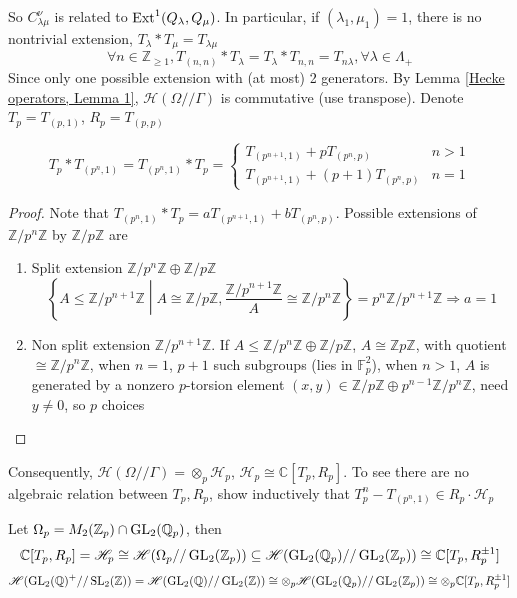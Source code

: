 \documentclass[main]{subfiles}
\begin{document}
So $C^\nu_{\lambda\mu}$ is related to $\operatorname{Ext}^1(Q_\lambda,Q_\mu)$. In particular, if $(\lambda_1,\mu_1)=1$, there is no nontrivial extension, $T_\lambda*T_\mu=T_{\lambda\mu}$
\[\forall n\in\mathbb Z_{\geq1},T_{(n,n)}*T_\lambda=T_\lambda*T_{{n,n}}=T_{n\lambda},\forall\lambda\in\Lambda_+\]
Since only one possible extension with (at most) 2 generators. By Lemma \ref{Hecke operators, Lemma 1}, $\mathscr H(\Omega//\Gamma)$ is commutative (use transpose). Denote $T_p=T_{(p,1)}$, $R_p=T_{(p,p)}$

\begin{lemma}\label{Hecke operators Lemma 4}
\[T_{p}*T_{(p^n,1)}=T_{(p^n,1)}*T_p=\begin{cases}
T_{(p^{n+1},1)}+pT_{(p^n,p)}&n>1 \\
T_{(p^{n+1},1)}+(p+1)T_{(p^n,p)}&n=1
\end{cases}\]
\end{lemma}

\begin{proof}
Note that $T_{(p^n,1)}*T_p=aT_{(p^{n+1},1)}+bT_{(p^n,p)}$. Possible extensions of $\mathbb Z/p^n\mathbb Z$ by $\mathbb Z/p\mathbb Z$ are
\begin{enumerate}[leftmargin=*]
\item Split extension $\mathbb Z/p^n\mathbb Z\oplus\mathbb Z/p\mathbb Z$
\[\left\{A\leq\mathbb Z/p^{n+1}\mathbb Z\middle| A\cong\mathbb Z/p\mathbb Z,\frac{\mathbb Z/p^{n+1}\mathbb Z}{A}\cong\mathbb Z/p^{n}\mathbb Z\right\}=p^n\mathbb Z/p^{n+1}\mathbb Z\Rightarrow a=1\]
\item Non split extension $\mathbb Z/p^{n+1}\mathbb Z$. If $A\leq\mathbb Z/p^n\mathbb Z\oplus\mathbb Z/p\mathbb Z$, $A\cong\mathbb Zp\mathbb Z$, with quotient $\cong\mathbb Z/p^n\mathbb Z$, when $n=1$, $p+1$ such subgroups (lies in $\mathbb F_p^2$), when $n>1$, $A$ is generated by a nonzero $p$-torsion element $(x,y)\in\mathbb Z/p\mathbb Z\oplus p^{n-1}\mathbb Z/p^n\mathbb Z$, need $y\neq 0$, so $p$ choices
\end{enumerate}
\end{proof}

Consequently, $\mathscr H(\Omega//\Gamma)=\otimes_p\mathscr H_p$, $\mathscr H_p\cong\mathbb C[T_p,R_p]$. To see there are no algebraic relation between $T_p,R_p$, show inductively that $T^n_p-T_{(p^n,1)}\in R_p\cdot\mathscr H_p$

\begin{remark}
Let $\Omega_p=M_2(\mathbb Z_p)\cap\operatorname{GL}_2(\mathbb Q_p)$, then
\[\mathbb C[T_p,R_p]=\mathscr H_p\cong\mathscr H(\Omega_p//\operatorname{GL}_2(\mathbb Z_p))\subseteq\mathscr H(\operatorname{GL}_2(\mathbb Q_p)//\operatorname{GL}_2(\mathbb Z_p))\cong\mathbb C[T_p,R_p^{\pm1}]\]
\[\mathscr H(\operatorname{GL}_2(\mathbb Q)^+//\operatorname{SL}_2(\mathbb Z))=\mathscr H(\operatorname{GL}_2(\mathbb Q)//\operatorname{GL}_2(\mathbb Z))\cong\otimes_p\mathscr H(\operatorname{GL}_2(\mathbb Q_p)//\operatorname{GL}_2(\mathbb Z_p))\cong\otimes_p\mathbb C[T_p,R_p^{\pm1}]\]
\end{remark}
\end{document}
